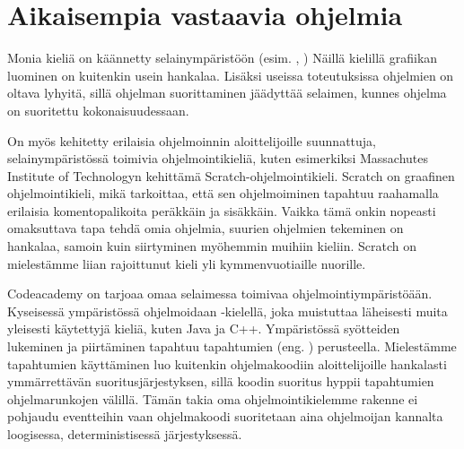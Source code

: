 
\section{Aikaisempia vastaavia ohjelmia}
Monia kieliä on käännetty selainympäristöön
(esim. , ) \cite{repl.it}
Näillä kielillä grafiikan luominen on kuitenkin usein hankalaa.
Lisäksi useissa toteutuksissa ohjelmien on oltava lyhyitä,
sillä ohjelman suorittaminen jäädyttää selaimen,
kunnes ohjelma on suoritettu kokonaisuudessaan.

On myös kehitetty erilaisia ohjelmoinnin aloittelijoille suunnattuja,
selainympäristössä toimivia ohjelmointikieliä,
kuten esimerkiksi Massachutes Institute of Technologyn
kehittämä Scratch-ohjelmointikieli.
Scratch on graafinen ohjelmointikieli,
mikä tarkoittaa,
että sen ohjelmoiminen tapahtuu raahamalla erilaisia komentopalikoita
peräkkäin ja sisäkkäin.
Vaikka tämä onkin nopeasti omaksuttava tapa tehdä omia ohjelmia,
suurien ohjelmien tekeminen on hankalaa,
samoin kuin siirtyminen myöhemmin muihiin kieliin.
Scratch on mielestämme liian rajoittunut kieli
yli kymmenvuotiaille nuorille.

Codeacademy on tarjoaa omaa selaimessa toimivaa ohjelmointiympäristöään.
Kyseisessä ympäristössä ohjelmoidaan -kielellä,
joka muistuttaa läheisesti muita yleisesti käytettyjä kieliä,
kuten Java ja C++.
Ympäristössä syötteiden lukeminen ja piirtäminen
tapahtuu tapahtumien (eng. ) perusteella.
Mielestämme tapahtumien käyttäminen luo kuitenkin ohjelmakoodiin
aloittelijoille hankalasti ymmärrettävän suoritusjärjestyksen,
sillä koodin suoritus hyppii tapahtumien ohjelmarunkojen välillä.
Tämän takia oma ohjelmointikielemme rakenne ei pohjaudu eventteihin
vaan ohjelmakoodi suoritetaan aina ohjelmoijan kannalta loogisessa,
deterministisessä järjestyksessä.
